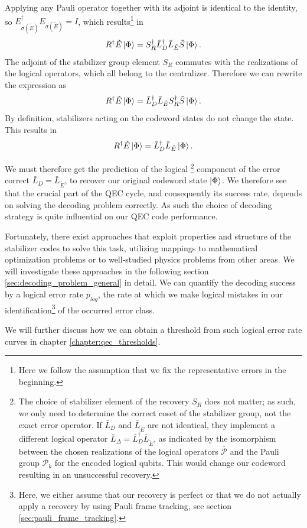 \begin{enumerate}
Applying any Pauli operator together with its adjoint is identical to the identity, so $E_{\sigma(\tilde{E})}^\dag E_{\sigma(\tilde{E})} = I$, which results\footnote{
Here we follow the assumption that we fix the representative errors in the beginning.
} in 
\begin{equation}
    R^\dag \tilde{E} \ket{\Phi} = S_R^\dag \bar{L}_D^\dag \bar{L}_{\tilde{E}} \tilde{S}\ket{\Phi}.
\end{equation}
The adjoint of the stabilizer group element $S_R$ commutes with the realizations of the logical operators, which all belong to the centralizer.
Therefore we can rewrite the expression as 
\begin{equation}
    R^\dag \tilde{E} \ket{\Phi} = \bar{L}_D^\dag \bar{L}_{\tilde{E}} S_R^\dag \tilde{S}\ket{\Phi}.
\end{equation}
By definition, stabilizers acting on the codeword states do not change the state.
This results in 
\begin{equation}
    R^\dag \tilde{E} \ket{\Phi} = \bar{L}_D^\dag \bar{L}_{\tilde{E}} \ket{\Phi}.
\end{equation}

We must therefore get the prediction of the logical 
\footnote{
The choice of stabilizer element of the recovery $S_R$ does not matter; as such, we only need to determine the correct coset of the stabilizer group, not the exact error operator.
If $\bar{L}_D$ and $\bar{L}_{\tilde{E}}$ are not identical, they implement a different logical operator $\bar{L}_\Delta = \bar{L}_D^\dag \bar{L}_{\tilde{E}}$, 
as indicated by the isomorphism between the chosen realizations of the logical operators $\bar{\mathcal{P}}$ and the Pauli group $\mathcal{P}_k$ for the encoded logical qubits.
This would change our codeword resulting in an unsuccessful recovery.
} component of the error correct $\bar{L}_D=\bar{L}_{\tilde{E}}$, to recover our original codeword state $\ket{\Phi}$.
We therefore see that the crucial part of the QEC cycle, and consequently its success rate, depends on solving the decoding problem correctly.
As such the choice of decoding strategy is quite influential on our QEC code performance.

Fortunately, there exist approaches that exploit properties and structure of the stabilizer codes to solve this task, utilizing mappings to mathematical optimization problems or to well-studied physics problems from other areas. 
We will investigate these approaches in the following section \ref{sec:decoding_problem_general} in detail.
We can quantify the decoding success by a logical error rate $p_{log}$, the rate at which we make logical mistakes in our identification\footnote{
    Here, we either assume that our recovery is perfect or that we do not actually apply a recovery by using Pauli frame tracking, see section \ref{sec:pauli_frame_tracking}.
} of the occurred error class.

We will further discuss how we can obtain a threshold from such logical error rate curves in chapter \ref{chapter:qec_thresholds}.

\end{enumerate}

